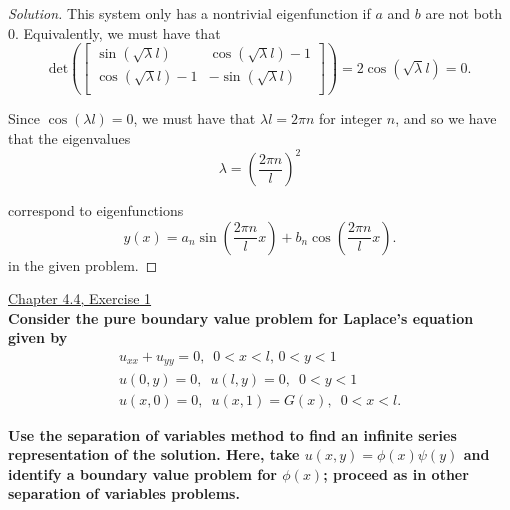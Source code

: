 \documentclass[11pt]{article}
\newenvironment{solution}
  {\renewcommand\qedsymbol{$\blacksquare$}\begin{proof}[Solution]}
  {\end{proof}}
\begin{document}
\begin{solution}
This system only has a nontrivial eigenfunction if $a$ and $b$ are not both $0$. Equivalently, we must have that
\[ \mathrm{det} \left( \begin{bmatrix}
    \sin(\sqrt{\lambda} l) & \cos(\sqrt{\lambda} l) - 1 \\
    \cos(\sqrt{\lambda} l) - 1 & -\sin(\sqrt{\lambda} l) \\
    \end{bmatrix} \right) = 2\cos(\sqrt{\lambda} l) = 0. \]

Since $\cos(\lambda l) = 0$, we must have that $\lambda l = 2\pi n$ for integer $n$, and so we have that the eigenvalues 
\[\boxed{\lambda = \left( \frac{2\pi n}{l}\right)^2}\] 

correspond to eigenfunctions \[ \boxed{y(x) = a_n \sin \left( \frac{2\pi n}{l} x\right) + b_n \cos \left( \frac{2\pi n}{l} x\right)}.\]
in the given problem. \end{solution}

\newpage

\underline{Chapter 4.4, Exercise 1} \\

\textbf{Consider the pure boundary value problem for Laplace's equation given by}
\[
\begin{array}{c}
    u_{xx} + u_{yy} = 0, \, \, \, 0 < x< l, \, 0 < y < 1 \\
    u(0, y) =0, \, \, \, u(l, y) = 0, \, \, \, 0 < y < 1 \\
    u(x, 0) = 0, \, \, \, u(x, 1) = G(x), \, \, \, 0 < x < l.
\end{array}
\]

\textbf{Use the separation of variables method to find an infinite series representation of the solution. Here, take $u(x, y) = \phi(x)\psi(y)$ and identify a boundary value problem for $\phi(x)$; proceed as in other separation of variables problems.}
\end{document}
